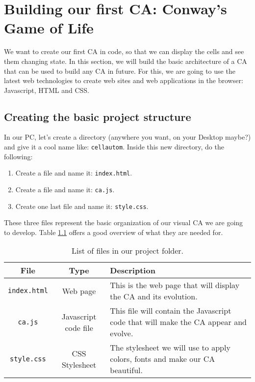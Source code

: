 
\chapter[Conway's Game of Life]{Building our first CA: Conway's Game of Life}
\label{sec:simpleca}

We want to create our first CA in code, so that we can display the cells and see them changing
state. In this section, we will build the basic architecture of a CA that can be used to build any
CA in future. For this, we are going to use the latest web technologies to create web sites and
web applications in the browser: Javascript, HTML and CSS.

\section{Creating the basic project structure}
In our PC, let's create a directory (anywhere you want, on your Desktop maybe?) and give it
a cool name like: \texttt{cellautom}. Inside this new directory, do the following:

\begin{enumerate}
\item Create a file and name it: \texttt{index.html}.
\item Create a file and name it: \texttt{ca.js}.
\item Create one last file and name it: \texttt{style.css}.
\end{enumerate}

These three files represent the basic organization of our visual CA we are going to develop.
Table \ref{tab:files} offers a good overview of what they are needed for.

%
\begin{table}[h]
  \footnotesize%
  \begin{center}
    \begin{tabular}{ccp{}}
      \toprule
      File & Type & Description \\
      \midrule
      \texttt{index.html} & Web page & This is the web page that will display the CA and its evolution.\\
      \texttt{ca.js} & Javascript code file  & This file will contain the Javascript
        code that will make the CA appear and evolve.\\
      \texttt{style.css} & CSS Stylesheet & The stylesheet we will use to apply colors, fonts 
        and make our CA beautiful.\\
      \bottomrule
    \end{tabular}
  \end{center}
  \caption[Files in project folder]{List of files in our project folder.}
  \label{tab:files}
\end{table}
%

